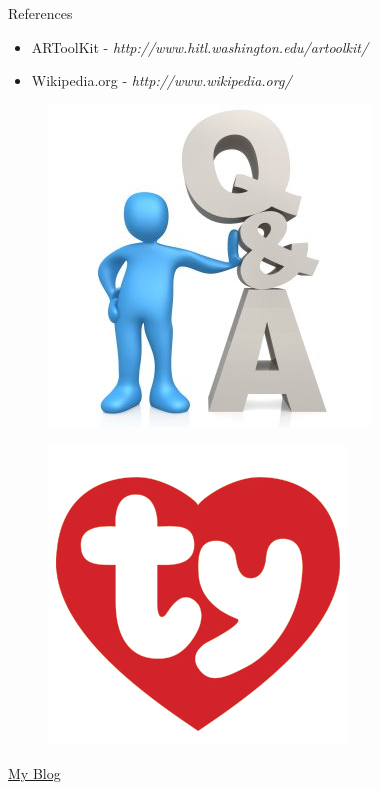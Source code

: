 \documentclass{beamer}
\begin{document}
\begin{frame}{References}
	\begin{itemize}
		\item ARToolKit - \emph{http://www.hitl.washington.edu/artoolkit/}
		\item Wikipedia.org - \emph{http://www.wikipedia.org/}
	\end{itemize}
\end{frame}


\begin{frame}
	\begin{figure}
		\includegraphics[scale=.70]{qa.jpg}
	\end{figure}
\end{frame}


\begin{frame}
	\begin{figure}
		\includegraphics[scale=.60]{ty.jpg}
	\end{figure}
	\begin{center}
		\href{http://jithusunnyk.blogspot.com}{\underline{My Blog}}
	\end{center}
\end{frame}
\end{document}

